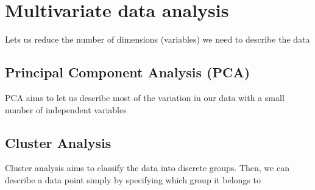 \section{Multivariate data analysis}
Lets us reduce the number of dimensions (variables) we need to describe the data

\subsection{Principal Component Analysis (PCA)}
\begin{leftbar}
PCA aims to let us describe most of the variation in our data with a small number of independent variables	
\end{leftbar}

\subsection{Cluster Analysis}
\begin{leftbar}
Cluster analysis aims to classify the data into discrete groups. Then, we can describe a data point simply by specifying which group it belongs to	
\end{leftbar}
